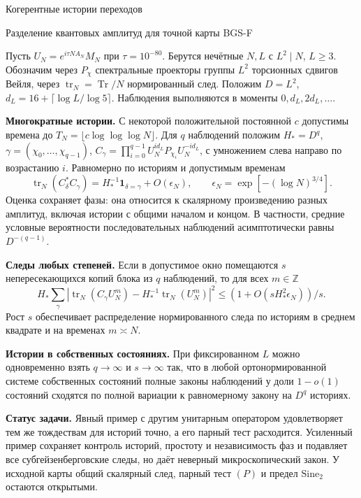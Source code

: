 \documentclass[11pt,a4paper]{article}
\newcommand{\Tr}{\operatorname{Tr}}
\newcommand{\trn}{\operatorname{tr}_N}
\newcommand{\Z}{\mathbb Z}
\newcommand{\subt}[1]{\par\medskip\noindent\textbf{#1.}\quad}
\begin{document}
\raggedright
{}
\begin{center}{\LARGE\sffamily Когерентные истории переходов}\par\vspace{4pt}
{\large Разделение квантовых амплитуд для точной карты BGS-F}
\end{center}

Пусть \(U_N=e^{i\tau NA_N}M_N\) при \(\tau=10^{-80}\). Берутся нечётные \(N,L\) с \(L^2\mid N\), \(L\ge3\). Обозначим через \(P_\chi\) спектральные проекторы группы \(L^2\) торсионных сдвигов Вейля, через \(\trn=\Tr/N\) нормированный след. Положим \(D=L^2\), \(d_L=16+\lceil\log L/\log 5\rceil\). Наблюдения выполняются в моменты \(0,d_L,2d_L,\ldots\).

\subt{Многократные истории}
С некоторой положительной постоянной \(c\) допустимы времена до \(T_N=\lfloor c\log\log\log N\rfloor\). Для \(q\) наблюдений положим \(H_*=D^q\), \(\gamma=(\chi_0,\ldots,\chi_{q-1})\), \(C_\gamma=\prod_{i=0}^{q-1} U_N^{i d_L}P_{\chi_i}U_N^{-i d_L}\), с умножением слева направо по возрастанию \(i\). Равномерно по историям и допустимым временам
\[
         \trn(C_\delta^* C_\gamma)
           =H_*^{-1}\mathbf 1_{\delta=\gamma}+O(\epsilon_N),
       \qquad \epsilon_N=\exp[-(\log N)^{3/4}].
\]
Оценка сохраняет фазы: она относится к скалярному произведению разных амплитуд, включая истории с общими началом и концом. В частности, средние условные вероятности последовательных наблюдений асимптотически равны \(D^{-(q-1)}\).

\subt{Следы любых степеней}
Если в допустимое окно помещаются \(s\) непересекающихся копий блока из \(q\) наблюдений, то для всех \(m\in\Z\)
\[
 H_*\sum_\gamma\left|\trn(C_\gamma U_N^m)
             - H_*^{-1}\trn(U_N^m)\right|^2
       \le (1+O(sH_*^2\epsilon_N))/s .
\]
Рост \(s\) обеспечивает распределение нормированного следа по историям в среднем квадрате и на временах \(m\asymp N\).

\subt{Истории в собственных состояниях}
При фиксированном \(L\) можно одновременно взять \(q\to\infty\) и \(s\to\infty\) так, что в любой ортонормированной системе собственных состояний полные законы наблюдений у доли \(1-o(1)\) состояний сходятся по полной вариации к равномерному закону на \(D^q\) историях.

\subt{Статус задачи}
Явный пример с другим унитарным оператором удовлетворяет тем же тождествам для историй точно, а его парный тест расходится. Усиленный пример сохраняет контроль историй, простоту и независимость фаз и подавляет все субгейзенберговские следы, но даёт неверный микроскопический закон. У исходной карты общий скалярный след, парный тест \((P)\) и предел \(\mathrm{Sine}_2\) остаются открытыми.
\end{document}
